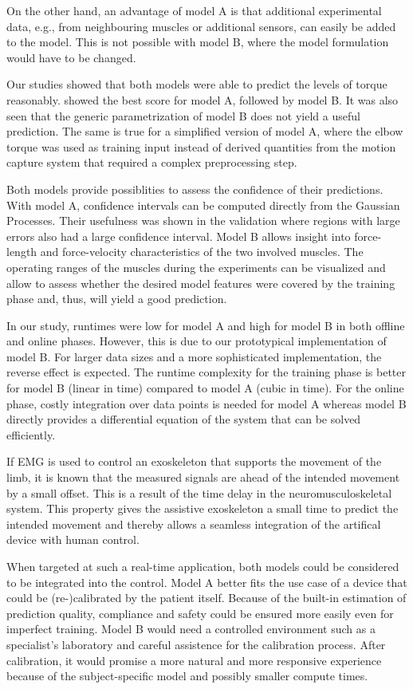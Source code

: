On the other hand, an advantage of model A is that additional experimental data, e.g., from neighbouring muscles or additional sensors, can easily be added to the model. This is not possible with model B, where the model formulation would have to be changed.

Our studies showed that both models were able to predict the levels of torque reasonably. 
 showed the best score for model A, followed by model B. It was also seen that the generic parametrization of model B does not yield a useful prediction. The same is true for a simplified version of model A, where the elbow torque was used as training input instead of derived quantities from the motion capture system that required a complex preprocessing step.

Both models provide possiblities to assess the confidence of their predictions. With model A, confidence intervals can be computed directly from the Gaussian Processes. Their usefulness was shown in the validation where regions with large errors also had a large confidence interval. 
Model B allows insight into force-length and force-velocity characteristics of the two involved muscles. The operating ranges of the muscles during the experiments can be visualized and allow to assess whether the desired model features were covered by the training phase and, thus, will yield a good prediction.

In our study, runtimes were low for model A and high for model B in both offline and online phases. However, this is due to our prototypical implementation of model B. For larger data sizes and a more sophisticated implementation, the reverse effect is expected. The runtime complexity for the training phase is better for model B (linear in time) compared to model A (cubic in time). For the online phase, costly integration over data points is needed for model A whereas model B directly provides a differential equation of the system that can be solved efficiently. 

If EMG is used to control an exoskeleton that supports the movement of the limb, it is known that the measured signals are ahead of the intended movement by a small offset. This is a result of the time delay in the neuromusculoskeletal system. This property gives the assistive exoskeleton a small time to predict the intended movement and thereby allows a seamless integration of the artifical device with human control.

When targeted at such a real-time application, both models could be considered to be integrated into the control. Model A better fits the use case of a device that could be (re\nobreakdash-)calibrated by the patient itself. Because of the built-in estimation of prediction quality, compliance and safety could be ensured more easily even for imperfect training.
Model B would need a controlled environment such as a specialist's laboratory and careful assistence for the calibration process.
After calibration, it would promise a more natural and more responsive experience because of the subject-specific model and possibly smaller compute times.

